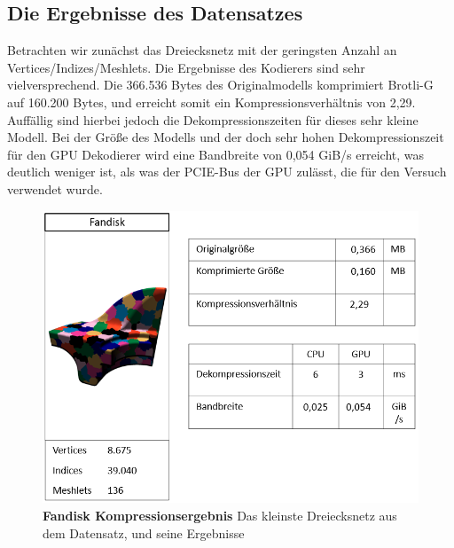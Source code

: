 \subsection{Die Ergebnisse des Datensatzes}
\label{subsec:auswertung1}
Betrachten wir zunächst das Dreiecksnetz mit der geringsten Anzahl an Vertices/Indizes/Meshlets. 
Die Ergebnisse des Kodierers sind sehr vielversprechend. 
Die 366.536 Bytes des Originalmodells komprimiert Brotli-G auf 160.200 Bytes, und erreicht somit ein Kompressionsverhältnis von 2,29.
Auffällig sind hierbei jedoch die Dekompressionszeiten für dieses sehr kleine Modell. 
Bei der Größe des Modells und der doch sehr hohen Dekompressionszeit für den GPU Dekodierer wird eine Bandbreite von 0,054 GiB/s erreicht, was deutlich weniger ist, als was der PCIE-Bus der GPU zulässt, die für den Versuch verwendet wurde.

\begin{figure}[htb]
  \centering  
  \includegraphics[scale=0.75]{Bilder/ergebnisse/fandisk.png}
  \caption[Fandisk Kompressionsergebnis]{\textbf{Fandisk Kompressionsergebnis} Das kleinste Dreiecksnetz aus dem Datensatz, und seine Ergebnisse}
  \label{fig:mesh_shading_pipeline}
\end{figure}

